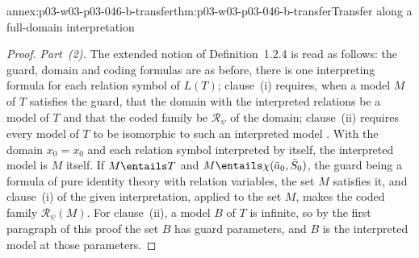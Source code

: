 \begin{annexitem}{annex:p03-w03-p03-046-b-transfer}{thm:p03-w03-p03-046-b-transfer}{Transfer along a full-domain interpretation}
\begin{proof}
\emph{Part~(2).} The extended notion of Definition~1.2.4 is read as
follows: the guard, domain and coding formulas are as before, there is one
interpreting formula for each relation symbol of \(L(T)\); clause~(i)
requires, when a model \(M\) of \(T\) satisfies the guard, that the domain
with the interpreted relations be a model of \(T\) and that the coded
family be \(\mathscr R_\psi\) of the domain; clause~(ii) requires every
model of \(T\) to be isomorphic to such an interpreted model
\cite[p.~448]{Baldwin1985DSOQ}. With the domain \(x_0=x_0\) and each
relation symbol interpreted by itself, the interpreted model is \(M\)
itself. If \(M\entails T\) and \(M\entails\chi(\bar a_0,\bar S_0)\), the
guard being a formula of pure identity theory with relation variables, the
set \(M\) satisfies it, and clause~(i) of the given interpretation, applied
to the set \(M\), makes the coded family \(\mathscr R_\psi(M)\). For
clause~(ii), a model \(B\) of \(T\) is infinite, so by the first paragraph
of this proof the set \(B\) has guard parameters, and \(B\) is the
interpreted model at those parameters.
\end{proof}
\end{annexitem}

